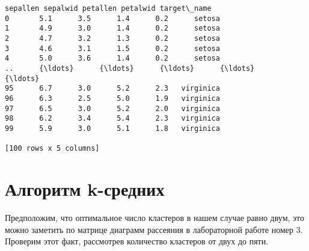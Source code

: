 \documentclass[11pt]{article}
\makeatletter
\newcommand{\boxspacing}{\kern\kvtcb@left@rule\kern\kvtcb@boxsep}
\newcommand{\prompt}[4]{
        {\ttfamily\llap{{\color{#2}[#3]:\hspace{3pt}#4}}\vspace{-\baselineskip}}
    }
\makeatother
\begin{document}
            \begin{tcolorbox}[breakable, size=fbox, boxrule=.5pt, pad at break*=1mm, opacityfill=0]
\prompt{Out}{outcolor}{2}{\boxspacing}
\begin{Verbatim}[commandchars=\\\{\}]
   sepallen sepalwid petallen petalwid target\_name
0       5.1      3.5      1.4      0.2      setosa
1       4.9      3.0      1.4      0.2      setosa
2       4.7      3.2      1.3      0.2      setosa
3       4.6      3.1      1.5      0.2      setosa
4       5.0      3.6      1.4      0.2      setosa
..      {\ldots}      {\ldots}      {\ldots}      {\ldots}         {\ldots}
95      6.7      3.0      5.2      2.3   virginica
96      6.3      2.5      5.0      1.9   virginica
97      6.5      3.0      5.2      2.0   virginica
98      6.2      3.4      5.4      2.3   virginica
99      5.9      3.0      5.1      1.8   virginica

[100 rows x 5 columns]
\end{Verbatim}
\end{tcolorbox}
        
    \section*{Алгоритм
k-средних}\label{ux430ux43bux433ux43eux440ux438ux442ux43c-k-ux441ux440ux435ux434ux43dux438ux445}

Предположим, что оптимальное число кластеров в нашем случае равно двум,
это можно заметить по матрице диаграмм рассеяния в лабораторной работе
номер 3. Проверим этот факт, рассмотрев количество кластеров от двух до
пяти.
\end{document}
